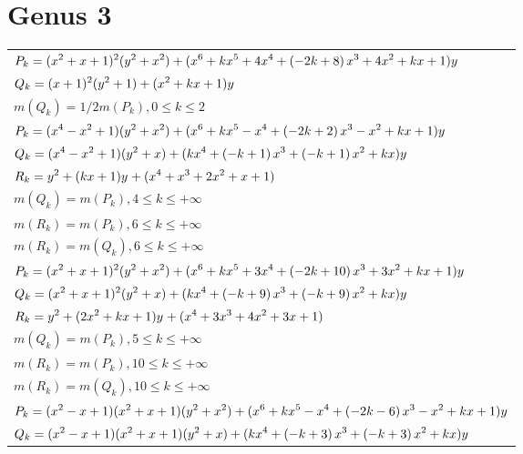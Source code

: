 \documentclass{amsart}
\begin{document}
\section{Genus 3}
\setlength{\LTleft}{-1.3in}
\begin{longtable}{|l|}
\hline
\(\displaystyle P_k=(x^2
 + x
 + 1)^{2}(y^2+x^2)+(x^6
 + k\*x^5
 + 4\*x^4
 + \left(-2\*k
 + 8\right) \*x^3
 + 4\*x^2
 + k\*x
 + 1)y\)\\
\(\displaystyle Q_k=(x
 + 1)^{2}(y^2+1)+(x^2
 + k\*x
 + 1)y\)\\
\(\displaystyle m(Q_k) = 1/2m(P_{k}),0 \leqslant k \leqslant 2\)\\
\hline
\(\displaystyle P_k=(x^4
 - x^2
 + 1)(y^2+x^2)+(x^6
 + k\*x^5
 - x^4
 + \left(-2\*k
 + 2\right) \*x^3
 - x^2
 + k\*x
 + 1)y\)\\
\(\displaystyle Q_k=(x^4
 - x^2
 + 1)(y^2+x)+(k\*x^4
 + \left(-k
 + 1\right) \*x^3
 + \left(-k
 + 1\right) \*x^2
 + k\*x)y\)\\
\(\displaystyle R_k=y^{2}+(k\*x
 + 1)y^{}+(x^4
 + x^3
 + 2\*x^2
 + x
 + 1)\)\\
\(\displaystyle m(Q_k) = m(P_{k}),4 \leqslant k \leqslant +\infty\)\\
\(\displaystyle m(R_k) = m(P_{k}),6 \leqslant k \leqslant +\infty\)\\
\(\displaystyle m(R_k) = m(Q_{k}),6 \leqslant k \leqslant +\infty\)\\
\hline
\(\displaystyle P_k=(x^2
 + x
 + 1)^{2}(y^2+x^2)+(x^6
 + k\*x^5
 + 3\*x^4
 + \left(-2\*k
 + 10\right) \*x^3
 + 3\*x^2
 + k\*x
 + 1)y\)\\
\(\displaystyle Q_k=(x^2
 + x
 + 1)^{2}(y^2+x)+(k\*x^4
 + \left(-k
 + 9\right) \*x^3
 + \left(-k
 + 9\right) \*x^2
 + k\*x)y\)\\
\(\displaystyle R_k=y^{2}+(2\*x^2
 + k\*x
 + 1)y^{}+(x^4
 + 3\*x^3
 + 4\*x^2
 + 3\*x
 + 1)\)\\
\(\displaystyle m(Q_k) = m(P_{k}),5 \leqslant k \leqslant +\infty\)\\
\(\displaystyle m(R_k) = m(P_{k}),10 \leqslant k \leqslant +\infty\)\\
\(\displaystyle m(R_k) = m(Q_{k}),10 \leqslant k \leqslant +\infty\)\\
\hline
\(\displaystyle P_k=(x^2
 - x
 + 1)(x^2
 + x
 + 1)(y^2+x^2)+(x^6
 + k\*x^5
 - x^4
 + \left(-2\*k
 - 6\right) \*x^3
 - x^2
 + k\*x
 + 1)y\)\\
\(\displaystyle Q_k=(x^2
 - x
 + 1)(x^2
 + x
 + 1)(y^2+x)+(k\*x^4
 + \left(-k
 + 3\right) \*x^3
 + \left(-k
 + 3\right) \*x^2
 + k\*x)y\)\\

\end{longtable}
\end{document}
